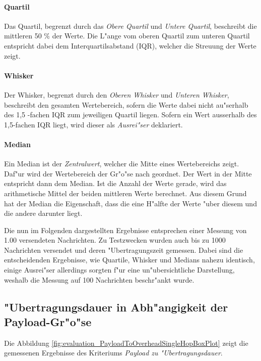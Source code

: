 
\paragraph{Quartil}
Das Quartil, begrenzt durch das \emph{Obere Quartil} und \emph{Untere Quartil}, beschreibt die mittleren 50 \% der Werte. Die L"ange vom oberen Quartil zum unteren Quartil entspricht dabei dem Interquartilsabstand (IQR), welcher die Streuung der Werte zeigt.
\paragraph{Whisker}
Der Whisker, begrenzt durch den \emph{Oberen Whisker} und \emph{Unteren Whisker}, beschreibt den gesamten Wertebereich, sofern die Werte dabei nicht au"serhalb des 1,5 -fachen IQR zum jeweiligen Quartil liegen. Sofern ein Wert ausserhalb des 1,5-fachen IQR liegt, wird dieser als \emph{Ausrei"ser} deklariert.
\paragraph{Median}
Ein Median ist der \emph{Zentralwert}, welcher die Mitte eines Wertebereichs zeigt. Daf"ur wird der Wertebereich der Gr"o"se nach geordnet. Der Wert in der Mitte entspricht dann dem Median. Ist die Anzahl der Werte gerade, wird das arithmetische Mittel der beiden mittleren Werte berechnet. Aus diesem Grund hat der Median die Eigenschaft, dass die eine H"alfte der Werte "uber diesem und die andere darunter liegt.

Die nun im Folgenden dargestellten Ergebnisse entsprechen einer Messung von 1.00 versendeten Nachrichten. Zu Testzwecken wurden auch bis zu 1000 Nachrichten versendet und deren "Ubertragungszeit gemessen. Dabei sind die entscheidenden Ergebnisse, wie Quartile, Whisker und Medians nahezu identisch, einige Ausrei"ser allerdings sorgten f"ur eine un"ubersichtliche Darstellung, weshalb die Messung auf 100 Nachrichten beschr"ankt wurde.

\subsection{"Ubertragungsdauer in Abh"angigkeit der Payload-Gr"o"se}


Die Abbildung \ref{fig:evaluation_PayloadToOverheadSingleHopBoxPlot} zeigt die gemessenen Ergebnisse des Kriteriums \emph{Payload zu "Ubertragungsdauer}.

